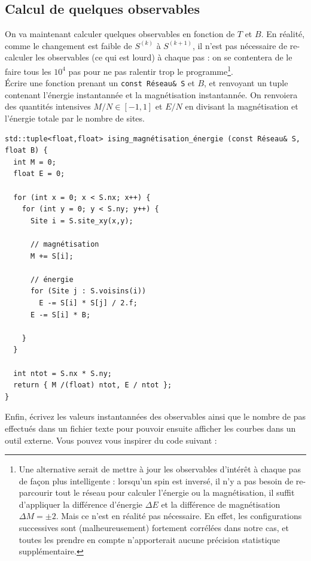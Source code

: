 \documentclass{book}
\newcommand{\inline}[1]{\texttt{#1}}
\begin{document}
\subsection{Calcul de quelques observables}

On va maintenant calculer quelques observables en fonction de $T$ et $B$. En réalité, comme le changement est faible de $S^{(k)}$ à $S^{(k+1)}$, il n'est pas nécessaire de re-calculer les observables (ce qui est lourd) à chaque pas : on se contentera de le faire tous les $10^4$ pas pour ne pas ralentir trop le programme\footnote{Une alternative serait de mettre à jour les observables d'intérêt à chaque pas de façon plus intelligente : lorsqu'un spin est inversé, il n'y a pas besoin de re-parcourir tout le réseau pour calculer l'énergie ou la magnétisation, il suffit d'appliquer la différence d'énergie $\Delta E$ et la différence de magnétisation $\Delta  M=\pm 2$. Mais ce n'est en réalité pas nécessaire. En effet, les configurations successives sont (malheureusement) fortement corrélées dans notre cas, et toutes les prendre en compte n'apporterait aucune précision statistique supplémentaire.}.\\

Écrire une fonction prenant un \inline{const Réseau& S} et $B$, et renvoyant un tuple contenant l'énergie instantannée et la magnétisation instantannée. On renvoiera des quantités intensives $M/N\in[-1,1]$ et $E/N$ en divisant la magnétisation et l'énergie totale par le nombre de sites.

\begin{correction}
\begin{verbatim}
std::tuple<float,float> ising_magnétisation_énergie (const Réseau& S, float B) {
  int M = 0;
  float E = 0;

  for (int x = 0; x < S.nx; x++) {
    for (int y = 0; y < S.ny; y++) {
      Site i = S.site_xy(x,y);

      // magnétisation
      M += S[i];

      // énergie
      for (Site j : S.voisins(i)) 
        E -= S[i] * S[j] / 2.f;
      E -= S[i] * B;

    }
  }

  int ntot = S.nx * S.ny;
  return { M /(float) ntot, E / ntot };
}
\end{verbatim}
\end{correction}

Enfin, écrivez les valeurs instantannées des observables ainsi que le nombre de pas effectués dans un fichier texte pour pouvoir ensuite afficher les courbes dans un outil externe. Vous pouvez vous inspirer du code suivant :
\end{document}
